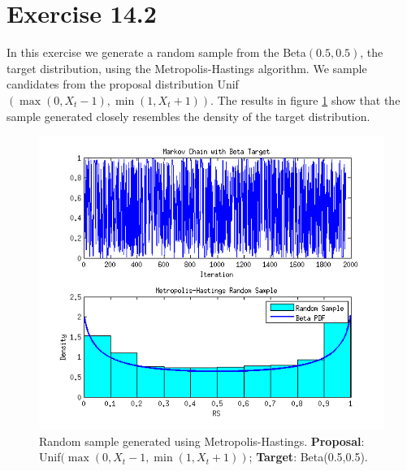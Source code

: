\documentclass[12pt,a4paper]{article}
\begin{document}
\section*{Exercise 14.2}
In this exercise we generate a random sample from the Beta$(0.5,0.5)$, the target distribution, using the Metropolis-Hastings algorithm. We sample candidates from the proposal distribution Unif$(\max(0, X_t-1),\min(1,X_t+1))$. The results in figure \ref{q2fig1} show that the sample generated closely resembles the density of the target distribution.
\begin{figure}[ht!] 
\begin{center}
\includegraphics[scale=.9]{graph3.png}
\caption{Random sample generated using Metropolis-Hastings. \textbf{Proposal}: Unif$(\max(0, X_t-1,\min(1,X_t+1))$;  \textbf{Target}: Beta(0.5,0.5).}
\label{q2fig1}
\end{center}
\end{figure}
\FloatBarrier
\end{document}
